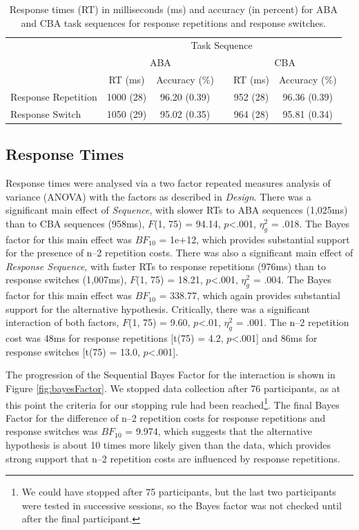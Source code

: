 \documentclass[a4paper, doc, natbib]{apa6}
\begin{document}
\begin{table}[htbp]
\centering
\caption{Response times (RT) in milliseconds (ms) and accuracy (in percent) for ABA and CBA task sequences for response repetitions and response switches.}
\label{my-label}
\begin{tabular}{lccccc}
\hline
                    & \multicolumn{5}{c}{Task Sequence}                       \\ \cline{2-6} 
                    & \multicolumn{2}{c}{ABA}   &  & \multicolumn{2}{c}{CBA}  \\ \cline{2-3} \cline{5-6} 
                    & RT (ms)   & Accuracy (\%) &  & RT (ms)  & Accuracy (\%) \\ \hline
Response Repetition & 1000 (28) & 96.20 (0.39)  &  & 952 (28) & 96.36 (0.39) \\
Response Switch     & 1050 (29) & 95.02 (0.35)  &  & 964 (28) & 95.81 (0.34) \\ \hline
\end{tabular}
\label{tab:behaviouralData}
\end{table}

\subsection{Response Times}
Response times were analysed via a two factor repeated measures analysis of variance (ANOVA) with the factors as described in \emph{Design}. There was a significant main effect of \emph{Sequence}, with slower RTs to ABA sequences (1,025ms) than to CBA sequences (958ms), $F$(1, 75) = 94.14, $p$<.001, $\eta_g^2$ = .018. The Bayes factor for this main effect was $BF_{10}$ = 1e+12, which provides substantial support for the presence of n--2 repetition costs. There was also a significant main effect of \emph{Response Sequence}, with faster RTs to response repetitions (976ms) than to response switches (1,007ms), $F$(1, 75) = 18.21, $p$<.001, $\eta_g^2$ = .004. The Bayes factor for this main effect was $BF_{10}$ = 338.77, which again provides substantial support for the alternative hypothesis. Critically, there was a significant interaction of both factors, $F$(1, 75) = 9.60, $p$<.01, $\eta_g^2$ = .001. The n--2 repetition cost was 48ms for response repetitions [t(75) = 4.2, $p$<.001] and 86ms for response switches [t(75) = 13.0, $p$<.001]. 

The progression of the Sequential Bayes Factor for the interaction is shown in Figure \ref{fig:bayesFactor}. We stopped data collection after 76 participants, as at this point the criteria for our stopping rule had been reached\footnote{We could have stopped after 75 participants, but the last two participants were tested in successive sessions, so the Bayes factor was not checked until after the final participant.}. The final Bayes Factor for the difference of n--2 repetition costs for response repetitions and response switches was $BF_{10}$ = 9.974, which suggests that the alternative hypothesis is about 10 times more likely given than the data, which provides strong support that n--2 repetition costs are influenced by response repetitions.
\end{document}
